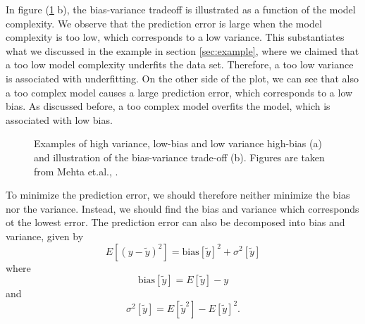 In figure (\ref{fig:bias_variance} b), the bias-variance tradeoff is illustrated as a function of the model complexity. We observe that the prediction error is large when the model complexity is too low, which corresponds to a low variance. This substantiates what we discussed in the example in section \ref{sec:example}, where we claimed that a too low model complexity underfits the data set. Therefore, a too low variance is associated with underfitting. On the other side of the plot, we can see that also a too complex model causes a large prediction error, which corresponds to a low bias. As discussed before, a too complex model overfits the model, which is associated with low bias. 

\begin{figure}
	\centering
	\caption{Examples of high variance, low-bias and low variance high-bias (a) and illustration of the bias-variance trade-off (b). Figures are taken from Mehta et.al., \cite{mehta_high-bias_2019}.}%
	\label{fig:bias_variance}
\end{figure}

To minimize the prediction error, we should therefore neither minimize the bias nor the variance. Instead, we should find the bias and variance which corresponds ot the lowest error. The prediction error can also be decomposed into bias and variance, given by
\begin{equation}
E[(y-\tilde{y})^2]=\text{bias}[\tilde{y}]^2+\sigma^2[\tilde{y}]
\end{equation}
where 
\begin{equation}
\text{bias}[\tilde{y}]=E[\tilde{y}]-y
\end{equation}
and 
\begin{equation}
\sigma^2[\tilde{y}]=E[\tilde{y}^2]-E[\tilde{y}]^2.
\end{equation}

